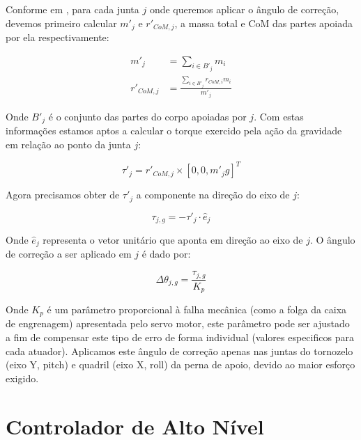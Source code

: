 Conforme em \cite{Maximo2017}, para cada junta $j$ onde queremos aplicar o ângulo de correção, devemos primeiro calcular $m'_j$ e $r'_{CoM, j}$, a massa total e CoM das partes apoiada por ela respectivamente:

\begin{align}
    \label{eq:mass_total}
    m'_j &= \sum_{i \in B'_j} m_i \\
    \label{eq:com_total}
    r'_{CoM, j} &= \frac{\sum_{i \in B'_j} r_{CoM, i} m_i}{m'_j}
\end{align}

Onde $B'_j$ é o conjunto das partes do corpo apoiadas por $j$. Com estas informações estamos aptos a calcular o torque exercido pela ação da gravidade em relação ao ponto da junta $j$:

\begin{equation}
    \label{eq:torque_gravidade}
    \tau'_j = r'_{CoM, j} \times [0,0,m'_j g]^T
\end{equation}

Agora precisamos obter de $\tau'_j$ a componente na direção do eixo de $j$:

\begin{equation}
    \label{eq:torque_eixo}
    \tau_{j, g} = -\tau'_j \cdot \hat{e}_j
\end{equation}

Onde $\hat{e}_j$ representa o vetor unitário que aponta em direção ao eixo de $j$. O ângulo de correção a ser aplicado em $j$ é dado por:

\begin{equation}
    \label{eq:correcao_angulo}
    \Delta\theta_{j, g} = \frac{\tau_{j, g}}{K_p}
\end{equation}

Onde $K_p$ é um parâmetro proporcional à falha mecânica (como a folga da caixa de engrenagem) apresentada pelo servo motor, este parâmetro pode ser ajustado a fim de compensar este tipo de erro de forma individual (valores especificos para cada atuador). Aplicamos este ângulo de correção apenas nas juntas do tornozelo (eixo Y, pitch) e quadril (eixo X, roll) da perna de apoio, devido ao maior esforço exigido.

\section{Controlador de Alto Nível}
\label{sec:controlador_alto_nivel}

